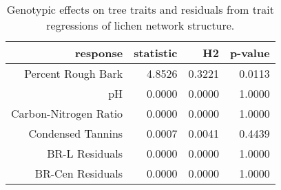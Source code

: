 \begin{table}[ht]
\centering
\begin{tabular}{rrrr}
  \hline
response & statistic & H2 & p-value \\ 
  \hline
Percent Rough Bark & 4.8526 & 0.3221 & 0.0113 \\ 
  pH & 0.0000 & 0.0000 & 1.0000 \\ 
  Carbon-Nitrogen Ratio & 0.0000 & 0.0000 & 1.0000 \\ 
  Condensed Tannins & 0.0007 & 0.0041 & 0.4439 \\ 
  BR-L Residuals & 0.0000 & 0.0000 & 1.0000 \\ 
  BR-Cen Residuals & 0.0000 & 0.0000 & 1.0000 \\ 
   \hline
\end{tabular}
\caption{Genotypic effects on tree traits and residuals from trait regressions of lichen network structure.} 
\label{tab:h2_trait}
\end{table}

